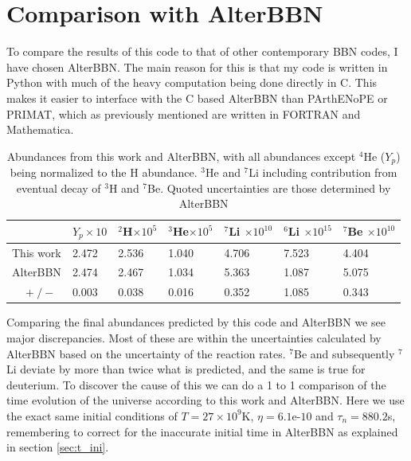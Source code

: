 \section{Comparison with AlterBBN}
\label{sec:Altercompare}
To compare the results of this code to that of other contemporary BBN codes, I have chosen AlterBBN. The main reason for this is that my code is written in Python with much of the heavy computation being done directly in C. This makes it easier to interface with the C based AlterBBN than PArthENoPE or PRIMAT, which as previously mentioned are written in FORTRAN and Mathematica. 
\begin{table}[ht]
    \begin{tabular}{l|llllll}
        & $Y_p \times 10$ & \hspace{-0.34em}$^{2}$H$ \times 10^{5}$ & \hspace{-0.34em}$^{3}$He$ \times 10^{5}$ & \hspace{-0.34em}$^{7}$Li $ \times 10^{10}$& \hspace{-0.34em}$^{6}$Li $ \times 10^{15}$& \hspace{-0.34em}$^{7}$Be $ \times 10^{10}$\\ \hline
    This work & 2.472            & 2.536 & 1.040 & 4.706 & 7.523 & 4.404   \\ \hline
    AlterBBN & 2.474            & 2.467 & 1.034 & 5.363 & 1.087 & 5.075   \\ %
    $\quad +/-$ & 0.003           & 0.038 & 0.016 & 0.352 & 1.085 & 0.343      
    \end{tabular}
    \caption{Abundances from this work and AlterBBN, with all abundances except ${}^4$He ($Y_p$) being normalized to the H abundance. ${}^3$He and ${}^7$Li including contribution from eventual decay of ${}^3$H and ${}^7$Be. Quoted uncertainties are those determined by AlterBBN}
    \label{tab:shortAlterabun}
\end{table}


Comparing the final abundances predicted by this code and AlterBBN we see major discrepancies. Most of these are within the uncertainties calculated by AlterBBN based on the uncertainty of the reaction rates. ${}^7$Be and subsequently ${}^7$Li deviate by more than twice what is predicted, and the same is true for deuterium. To discover the cause of this we can do a 1 to 1 comparison of the time evolution of the universe according to this work and AlterBBN. Here we use the exact same initial conditions of $T=27\times10^9$K, $\eta=6.1$e-$10$ and $\tau_n=880.2$s, remembering to correct for the inaccurate initial time in AlterBBN as explained in section \ref{sec:t_ini}.

